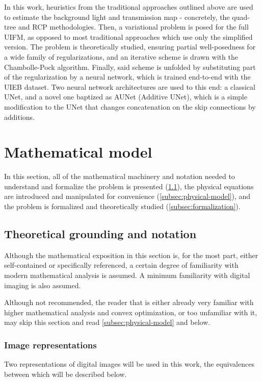 \documentclass[twocolumn,twoside,a4paper,10pt]{IEEEtran}
\begin{document}
In this work, heuristics from the traditional approaches outlined above are used to estimate the background light and transmission map - concretely, the quad-tree and RCP methodologies. Then, a variational problem is posed for the
full UIFM, as opposed to most traditional approaches which use only the simplified version. The problem is theoretically studied, ensuring partial well-posedness for a wide family of regularizations, and an iterative scheme is
drawn with the Chambolle-Pock algorithm. Finally, said scheme is unfolded by
substituting part of the regularization by a neural network, which is trained
end-to-end with the UIEB dataset. Two neural network architectures are used
to this end: a classical UNet, and a novel one baptized as AUNet (Additive UNet),
which is a simple modification to the UNet that changes concatenation on the
skip connections by additions.
\section{Mathematical model}

In this section, all of the mathematical machinery and notation needed to understand and formalize the problem is presented (\cref{subsec:theoretical-grounding}), the physical equations are introduced and manipulated for convenience (\cref{subsec:physical-model}), and the problem is formalized and theoretically studied (\cref{subsec:formalization}).

\subsection{Theoretical grounding and notation}\label{subsec:theoretical-grounding}
Although the mathematical exposition in this section is, for the most part, either self-contained or specifically referenced, a certain degree of familiarity with modern mathematical analysis is assumed. A minimum familiarity with digital imaging is also assumed.

Although not recommended, the reader that is either already very familiar with higher mathematical analysis and convex optimization, or too unfamiliar with it, may skip this section and read \cref{subsec:physical-model} and below.

\subsubsection{Image representations}

Two representations of digital images will be used in this work, the equivalences between which will be described below.
\end{document}
